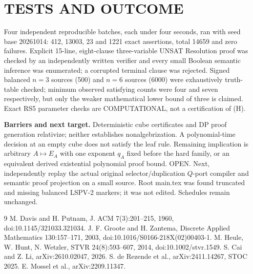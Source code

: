 \documentclass[11pt]{article}
\begin{document}
\section{TESTS AND OUTCOME}
Four independent reproducible batches, each under four seconds, ran with seed base 20261014: 412, 13003, 23 and 1221 exact assertions, total 14659 and zero failures. Explicit 15-line, eight-clause three-variable UNSAT Resolution proof was checked by an independently written verifier and every small Boolean semantic inference was enumerated; a corrupted terminal clause was rejected. Signed balanced $n=3$ sources (500) and $n=6$ sources (6000) were exhaustively truth-table checked; minimum observed satisfying counts were four and seven respectively, but only the weaker mathematical lower bound of three is claimed. Exact RS5 parameter checks are COMPUTATIONAL, not a certification of (H).
\par\noindent\textbf{Barriers and next target.} Deterministic cube certificates and DP proof generation relativize; neither establishes nonalgebrization. A polynomial-time decision at an empty cube does not satisfy the leaf rule. Remaining implication is arbitrary $A\mapsto E_A$ with one exponent $q_A$ fixed before the hard family, or an equivalent derived existential polynomial proof bound. OPEN. Next, independently replay the actual original selector/duplication $Q$-port compiler and semantic proof projection on a small source. Root main.tex was found truncated and missing balanced LSPV-2 markers; it was not edited. Schedules remain unchanged.
\begin{thebibliography}{9}
 M. Davis and H. Putnam, J. ACM 7(3):201--215, 1960, doi:10.1145/321033.321034.
 J. F. Groote and H. Zantema, Discrete Applied Mathematics 130:157--171, 2003, doi:10.1016/S0166-218X(02)00403-1.
 M. Heule, W. Hunt, N. Wetzler, STVR 24(8):593--607, 2014, doi:10.1002/stvr.1549.
 S. Cai and Z. Li, arXiv:2610.02047, 2026.
 S. de Rezende et al., arXiv:2411.14267, STOC 2025.
 E. Mossel et al., arXiv:2209.11347.
\end{thebibliography}
\end{document}
